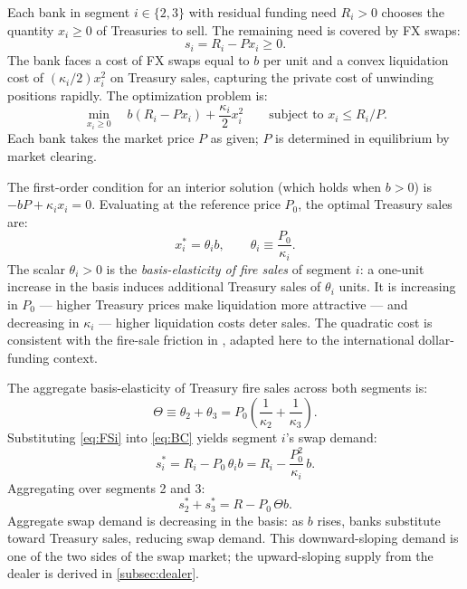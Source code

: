 Each bank in segment $i \in \{2,3\}$ with residual funding need $R_i > 0$ chooses the quantity
$x_i \geq 0$ of Treasuries to sell. The remaining need is covered by FX swaps:
\begin{equation}
  s_i = R_i - P x_i \geq 0. \tag{BC-$i$}
  \label{eq:BC}
\end{equation}
The bank faces a cost of FX swaps equal to $b$ per unit and a convex liquidation cost of $(\kappa_i/2)x_i^2$
on Treasury sales, capturing the private cost of unwinding positions rapidly. The optimization
problem is:
\begin{equation}
  \min_{x_i \geq 0} \quad b(R_i - P x_i) + \frac{\kappa_i}{2} x_i^2
  \qquad \text{subject to } x_i \leq R_i/P.
  \tag{P-$i$}
  \label{eq:Pi}
\end{equation}
Each bank takes the market price $P$ as given; $P$ is determined in equilibrium by market clearing.

The first-order condition for an interior solution (which holds when $b > 0$) is $-bP + \kappa_i x_i = 0$.
Evaluating at the reference price $P_0$, the optimal Treasury sales are:
\begin{equation}
  x_i^* = \theta_i b, \qquad \theta_i \equiv \frac{P_0}{\kappa_i}.
  \tag{FS-$i$}
  \label{eq:FSi}
\end{equation}
The scalar $\theta_i > 0$ is the \textit{basis-elasticity of fire sales} of segment $i$: a one-unit
increase in the basis induces additional Treasury sales of $\theta_i$ units. It is increasing in
$P_0$ — higher Treasury prices make liquidation more attractive — and decreasing in $\kappa_i$ —
higher liquidation costs deter sales. The quadratic cost is consistent with the fire-sale
friction in \citet{BrunnermeierPedersen2009}, adapted here to the international dollar-funding
context.

The aggregate basis-elasticity of Treasury fire sales across both segments is:
\begin{equation}
  \Theta \equiv \theta_2 + \theta_3 = P_0\!\left(\frac{1}{\kappa_2} + \frac{1}{\kappa_3}\right).
  \tag{$\Theta$-def}
  \label{eq:Theta}
\end{equation}
Substituting \eqref{eq:FSi} into \eqref{eq:BC} yields segment $i$'s swap demand:
\begin{equation}
  s_i^* = R_i - P_0\,\theta_i b = R_i - \frac{P_0^2}{\kappa_i}\,b.
  \tag{SD-$i$}
  \label{eq:SDi}
\end{equation}
Aggregating over segments 2 and 3:
\begin{equation}
  s_2^* + s_3^* = R - P_0\,\Theta b.
  \tag{SD-agg}
  \label{eq:SDagg}
\end{equation}
Aggregate swap demand is decreasing in the basis: as $b$ rises, banks substitute toward Treasury
sales, reducing swap demand. This downward-sloping demand is one of the two sides of the swap
market; the upward-sloping supply from the dealer is derived in \cref{subsec:dealer}.

